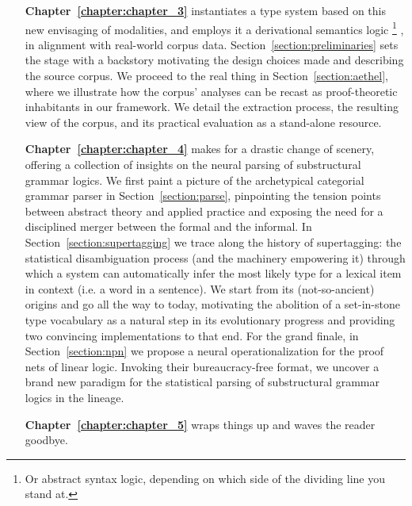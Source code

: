 {\begin{enumerate}[labelindent=2pt, itemindent=30pt, labelsep=5pt, widest=Chapter III,align=right,itemsep=5pt]
Unsatisfied by the comparison, we move on to Section~\ref{section:modalities_for_dependency}, where we appropriate the modalities we resorted to earlier, repurposing them now as dependency domain demarcators.
\item[\textbf{Chapter~\ref{chapter:chapter_3}}] instantiates a type system based on this new envisaging of modalities, and employs it a derivational semantics logic%
	\footnote{Or abstract syntax logic, depending on which side of the dividing line you stand at.}%
, in alignment with real-world corpus data. 
Section~\ref{section:preliminaries} sets the stage with a backstory motivating the design choices made and describing the source corpus.
We proceed to the real thing in Section~\ref{section:aethel}, where we illustrate how the corpus' analyses can be recast as proof-theoretic inhabitants in our framework.
We detail the extraction process, the resulting view of the corpus, and its practical evaluation as a stand-alone resource.
\item[\textbf{Chapter~\ref{chapter:chapter_4}}] makes for a drastic change of scenery, offering a collection of insights on the neural parsing of substructural grammar logics.
We first paint a picture of the archetypical categorial grammar parser in Section~\ref{section:parse}, pinpointing the tension points between abstract theory and applied practice and exposing the need for a disciplined merger between the formal and the informal.
In Section~\ref{section:supertagging} we trace along the history of supertagging: the statistical disambiguation process (and the machinery empowering it) through which a system can automatically infer the most likely type for a lexical item in context (i.e. a word in a sentence).
We start from its (not-so-ancient) origins and go all the way to today, motivating the abolition of a set-in-stone type vocabulary as a natural step in its evolutionary progress and providing two convincing implementations to that end.
For the grand finale, in Section~\ref{section:npn} we propose a neural operationalization for the proof nets of linear logic.
Invoking their bureaucracy-free format, we uncover a brand new paradigm for the statistical parsing of substructural grammar logics in the  lineage.
\item[\textbf{Chapter~\ref{chapter:chapter_5}}] wraps things up and waves the reader goodbye.
\end{enumerate}

}
